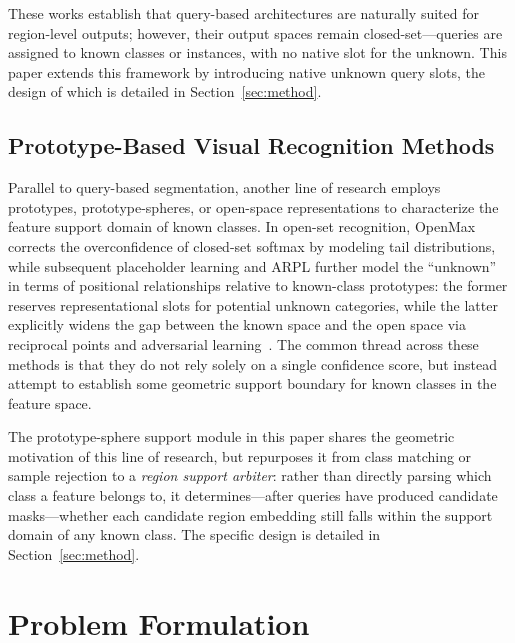 \documentclass[journal]{IEEEtai}
\begin{document}
These works establish that query-based architectures are naturally suited for
region-level outputs; however, their output spaces remain closed-set---queries are
assigned to known classes or instances, with no native slot for the unknown.
This paper extends this framework by introducing native unknown query slots,
the design of which is detailed in Section~\ref{sec:method}.

\subsection{Prototype-Based Visual Recognition Methods}
\label{sec:rw-proto}

Parallel to query-based segmentation, another line of research employs prototypes,
prototype-spheres, or open-space representations to characterize the feature support
domain of known classes.
In open-set recognition, OpenMax corrects the overconfidence of closed-set softmax
by modeling tail distributions, while subsequent placeholder learning and ARPL further
model the ``unknown'' in terms of positional relationships relative to known-class
prototypes: the former reserves representational slots for potential unknown categories,
while the latter explicitly widens the gap between the known space and the open space
via reciprocal points and adversarial
learning~\cite{bendale2016towardsopen,zhou2021learningplaceholders,chen2022adversarialreciprocal}.
The common thread across these methods is that they do not rely solely on a single
confidence score, but instead attempt to establish some geometric support boundary
for known classes in the feature space.

The prototype-sphere support module in this paper shares the geometric motivation of
this line of research, but repurposes it from class matching or sample rejection to a
\emph{region support arbiter}: rather than directly parsing which class a feature belongs
to, it determines---after queries have produced candidate masks---whether each candidate
region embedding still falls within the support domain of any known class.
The specific design is detailed in Section~\ref{sec:method}.




\section{Problem Formulation}\label{sec:problem}
\end{document}
